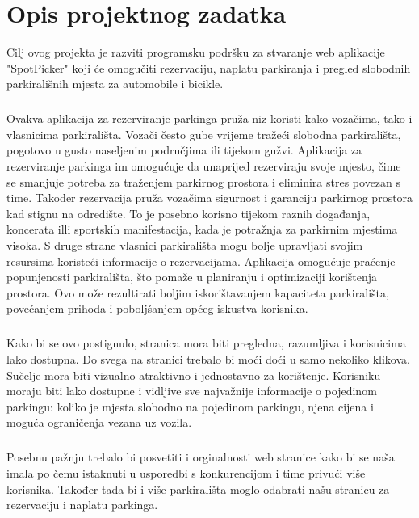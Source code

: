\chapter{Opis projektnog zadatka}


{Cilj ovog projekta je razviti programsku podršku za stvaranje web aplikacije "SpotPicker" koji će omogučiti rezervaciju, naplatu parkiranja i pregled slobodnih parkirališnih mjesta za automobile i bicikle. }
\paragraph*{}{Ovakva aplikacija za rezerviranje parkinga pruža niz koristi kako vozačima, tako i vlasnicima parkirališta. Vozači često gube vrijeme tražeći slobodna parkirališta, pogotovo u gusto naseljenim područjima ili tijekom gužvi. Aplikacija za rezerviranje parkinga im omogućuje da unaprijed rezerviraju svoje mjesto, čime se smanjuje potreba za traženjem parkirnog prostora i eliminira stres povezan s time. Također rezervacija pruža vozačima sigurnost i garanciju parkirnog prostora kad stignu na odredište. To je posebno korisno tijekom raznih događanja, koncerata illi sportskih manifestacija, kada je potražnja za parkirnim mjestima visoka. S druge strane vlasnici parkirališta mogu bolje upravljati svojim resursima koristeći informacije o rezervacijama. Aplikacija omogućuje praćenje popunjenosti parkirališta, što pomaže u planiranju i optimizaciji korištenja prostora. Ovo može rezultirati boljim iskorištavanjem kapaciteta parkirališta, povećanjem prihoda i poboljšanjem općeg iskustva korisnika.}
\paragraph*{}{Kako bi se ovo postignulo, stranica mora biti pregledna, razumljiva i korisnicima lako dostupna. Do svega na stranici trebalo bi moći doći u samo nekoliko klikova. Sučelje mora biti vizualno atraktivno i jednostavno za korištenje. Korisniku moraju biti lako dostupne i vidljive sve najvažnije informacije o pojedinom parkingu: koliko je mjesta slobodno na pojedinom parkingu, njena cijena i moguća ograničenja vezana uz vozila.}
\paragraph*{}{Posebnu pažnju trebalo bi posvetiti i orginalnosti web stranice kako bi se naša imala po čemu istaknuti u usporedbi s konkurencijom i time privući više korisnika. Također tada bi i više parkirališta moglo odabrati našu stranicu za rezervaciju i naplatu parkinga.}

